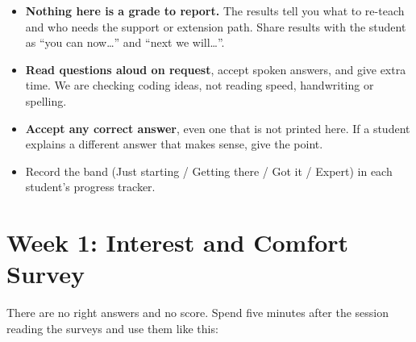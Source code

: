 
\begin{teachernote}
\begin{itemize}[itemsep=1pt]
  \item \textbf{Nothing here is a grade to report.} The results tell you what to re-teach and who needs the
        support or extension path. Share results with the student as \enquote{you can now\dots{}} and \enquote{next we will\dots}.
  \item \textbf{Read questions aloud on request}, accept spoken answers, and give extra time. We are
        checking coding ideas, not reading speed, handwriting or spelling.
  \item \textbf{Accept any correct answer}, even one that is not printed here. If a student explains a
        different answer that makes sense, give the point.
  \item Record the band (Just starting / Getting there / Got it / Expert) in each student's progress tracker.
\end{itemize}
\end{teachernote}

\newcommand{\bandtable}[4]{%
  \begin{center}\small\renewcommand{\arraystretch}{1.3}
  \begin{tabular}{@{}llll@{}}\toprule
  \faSeedling\ Just starting & \faShoePrints\ Getting there & \faCheckCircle\ Got it & \faRocket\ Expert\\\midrule
  #1 & #2 & #3 & #4\\\bottomrule
  \end{tabular}\end{center}}

\section{Week 1: Interest and Comfort Survey}
There are no right answers and no score. Spend five minutes after the session reading the surveys and use them like this:

